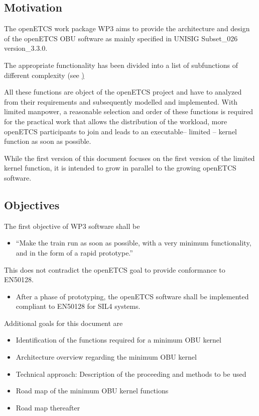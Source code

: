 
\subsection{Motivation}
\label{sec:Motivation}

The openETCS work package WP3 aims to provide the architecture and design of the openETCS OBU software as mainly specified in UNISIG Subset_026 version_3.3.0. 

The appropriate functionality has been divided into a list of subfunctions of different complexity (see \href{https://github.com/openETCS/SRS-Analysis/blob/master/System Analysis/List\_Functions.xlsx} ) 

All these functions are object of the openETCS project and have to analyzed from their requirements and subsequently modelled and implemented. With limited manpower, a reasonable selection and order of these functions is required for the practical work that allows the distribution of the workload, more openETCS participants to join and leads to an executable– limited – kernel function as soon as possible. 

While the first version of this document focuses on the first version of the limited kernel function, it is intended to grow in parallel to the growing openETCS software.


\subsection{Objectives}
\label{sec:Objectives}



The first objective of WP3 software shall be

\begin{itemize}
	\item “Make the train run as soon as possible, with a very minimum functionality, and in the form of a rapid prototype.”
\end{itemize}

This does not contradict the openETCS goal to provide conformance to EN50128.

\begin{itemize}
	\item After a phase of prototyping, the openETCS software shall be implemented compliant to EN50128 for SIL4 systems.
\end{itemize}

Additional goals for this document are

\begin{itemize}
	\item Identification of the functions required for a minimum OBU kernel
	\item Architecture overview regarding the minimum OBU kernel
	\item Technical approach: Description of the proceeding and methods to be used
	\item Road map of the minimum OBU kernel functions
	\item Road map thereafter
\end{itemize}

